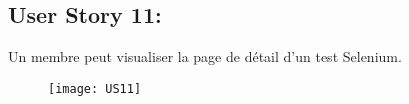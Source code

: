 \newpage
\subsection{User Story 11:}
Un membre peut visualiser la page de détail d'un test Selenium.

\begin{figure}[!h]
  \begin{center}
        \texttt{[image: US11]}
        \label{US11-dia}
  \end{center}
\end{figure}